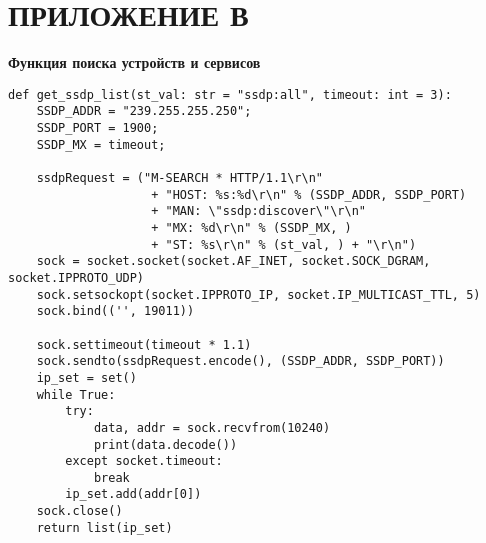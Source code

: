 \chapter*{ПРИЛОЖЕНИЕ В} \label{appendix:search-func}

\begin{center}
    \bfseries Функция поиска устройств и сервисов
\end{center}

\begin{verbatim}
def get_ssdp_list(st_val: str = "ssdp:all", timeout: int = 3):
    SSDP_ADDR = "239.255.255.250";
    SSDP_PORT = 1900;
    SSDP_MX = timeout;

    ssdpRequest = ("M-SEARCH * HTTP/1.1\r\n"
                    + "HOST: %s:%d\r\n" % (SSDP_ADDR, SSDP_PORT)
                    + "MAN: \"ssdp:discover\"\r\n"
                    + "MX: %d\r\n" % (SSDP_MX, )
                    + "ST: %s\r\n" % (st_val, ) + "\r\n")
    sock = socket.socket(socket.AF_INET, socket.SOCK_DGRAM, socket.IPPROTO_UDP)
    sock.setsockopt(socket.IPPROTO_IP, socket.IP_MULTICAST_TTL, 5)
    sock.bind(('', 19011))

    sock.settimeout(timeout * 1.1)
    sock.sendto(ssdpRequest.encode(), (SSDP_ADDR, SSDP_PORT))
    ip_set = set()
    while True:
        try:
            data, addr = sock.recvfrom(10240)
            print(data.decode())
        except socket.timeout:
            break
        ip_set.add(addr[0])
    sock.close()
    return list(ip_set)

\end{verbatim}

